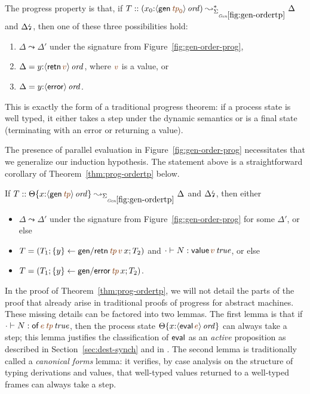 The progress property is that, if $T ::
(x_0{:}\istrue{\susp{{\sf gen}\,\lf{{\it tp}_0}}})
\leadsto^*_{\siggenordertp} \Delta$ and ${\Delta}{\mbox{\lightning}}_{}$, then
one of these three possibilities hold:

\smallskip
\begin{enumerate}
\item ${\Delta}{} \leadsto \Delta'$ under
the signature from Figure~\ref{fig:gen-order-prog}, 
\item $\Delta = y{:}\istrue{\susp{{\sf retn}\,\lf{v}}}$, where
  $\lf{v}$ is a value, or
\item $\Delta = y{:}{\langle {{\sf error}} \rangle}\,{{\it ord}}$.
\end{enumerate}
\smallskip

\noindent
This is exactly the form of a traditional progress theorem: if a
process state is well typed, it either takes a step under the dynamic
semantics or is a final state (terminating with an error or returning
a value).

The presence of parallel evaluation in Figure~\ref{fig:gen-order-prog}
necessitates that we generalize our induction hypothesis. The
statement above is a straightforward corollary of
Theorem~\ref{thm:prog-ordertp} below.

\bigskip
\begin{theorem}\label{thm:prog-ordertp}
If $T :: \tackon{\Theta}{x{:}\istrue{\susp{{\sf gen}\,\lf{{\it tp}}}}}
\leadsto_{\siggenordertp} \Delta$ and ${\Delta}{\mbox{\lightning}}_{}$, then
either 
\begin{itemize}
\item 
$\Delta \leadsto \Delta'$ under the signature from 
Figure~\ref{fig:gen-order-prog} for some $\Delta'$, or else
\item 
$T = \left(T_1; \trstep{y}{{\sf gen/retn}\,\lf{{\it tp}}\,\lf{v}\,x}; T_2\right)$ and $\cdot \vdash N : \isconc{{\sf value}\,\lf{v}}$, or else 
\item
$T = \left(T_1; \trstep{y}{{\sf gen/error}\,\lf{{\it tp}}\,x}; T_2\right)$.
\end{itemize}
\end{theorem}

\bigskip
In the proof of Theorem~\ref{thm:prog-ordertp}, we will not 
detail the parts of the proof that already arise in traditional proofs of
progress for abstract machines. These missing details can be factored
into two lemmas. The first lemma is that if $\cdot \vdash N :
\isconc{{\sf of}\,\lf{e}\,\lf{{\it tp}}}$, then the process state
$\tackon{\Theta}{x{:}\istrue{\susp{{\sf eval}\,\lf{e}}}}$ can always
take a step; this lemma justifies the classification of ${\sf eval}$
as an {\it active} proposition as described in
Section~\ref{sec:dest-synch} and in
\cite{pfenning09substructural}. The second lemma is traditionally
called a {\it canonical forms} lemma: it verifies, by case analysis on
the structure of typing derivations and values, that well-typed
values returned to a well-typed frames can always take a step.

